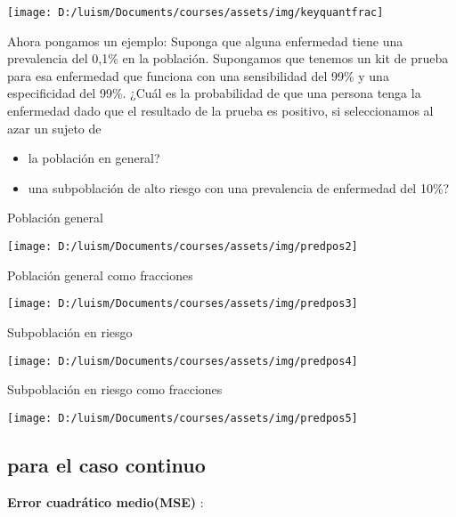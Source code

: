 \documentclass[
]{article}
\providecommand{\tightlist}{%
  \setlength{\itemsep}{0pt}\setlength{\parskip}{0pt}}
\begin{document}
\begin{center}\texttt{[image: D:/luism/Documents/courses/assets/img/keyquantfrac]} \end{center}

Ahora pongamos un ejemplo: Suponga que alguna enfermedad tiene una
prevalencia del 0,1\% en la población. Supongamos que tenemos un kit de
prueba para esa enfermedad que funciona con una sensibilidad del 99\% y
una especificidad del 99\%. ¿Cuál es la probabilidad de que una persona
tenga la enfermedad dado que el resultado de la prueba es positivo, si
seleccionamos al azar un sujeto de

\begin{itemize}
\tightlist
\item
  la población en general?
\item
  una subpoblación de alto riesgo con una prevalencia de enfermedad del
  10\%?
\end{itemize}

Población general

\begin{center}\texttt{[image: D:/luism/Documents/courses/assets/img/predpos2]} \end{center}

Población general como fracciones

\begin{center}\texttt{[image: D:/luism/Documents/courses/assets/img/predpos3]} \end{center}

Subpoblación en riesgo

\begin{center}\texttt{[image: D:/luism/Documents/courses/assets/img/predpos4]} \end{center}

Subpoblación en riesgo como fracciones

\begin{center}\texttt{[image: D:/luism/Documents/courses/assets/img/predpos5]} \end{center}

\hypertarget{para-el-caso-continuo}{%
\subsection{para el caso continuo}\label{para-el-caso-continuo}}

\textbf{Error cuadrático medio(MSE) }:
\end{document}
